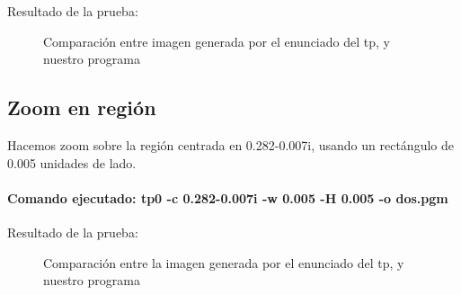 \documentclass [12pt, a4paper]{article}
\begin{document}
	Resultado de la prueba:
	\begin{figure}[h]
		\centering
		\caption{Comparación entre imagen generada por el enunciado del tp, y nuestro programa}
		\label{f:comparacion1}
	\end{figure}
	\subsection{Zoom en región}
	Hacemos zoom sobre la región centrada en 0.282-0.007i, usando un
	rectángulo de 0.005 unidades de lado.
	
	\paragraph{Comando ejecutado: tp0 -c 0.282-0.007i -w 0.005 -H 0.005 -o dos.pgm}
	
	Resultado de la prueba:
	\begin{figure}[h]
		\centering
		\caption{Comparación entre la imagen generada por el enunciado del tp, y nuestro programa}
		\label{f:comparacion2}
	\end{figure}
\end{document}
